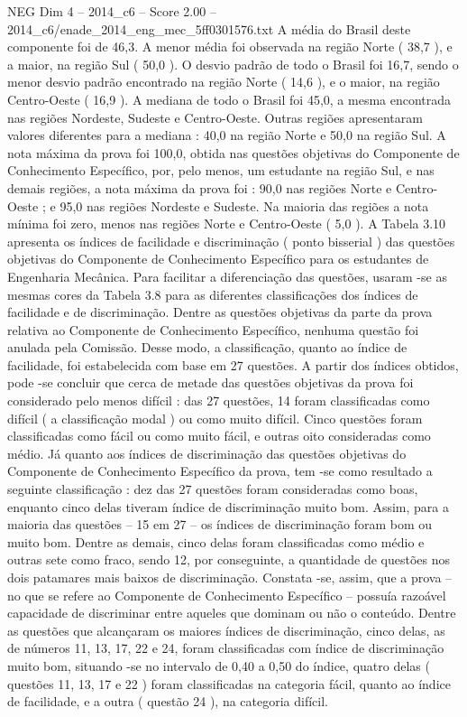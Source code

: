 \begin{textsample}{NEG Dim 4 – 2014\_c6 – Score 2.00 – 2014\_c6/enade\_2014\_eng\_mec\_5ff0301576.txt}
A média do Brasil deste componente foi de 46,3.
A menor média foi observada na região Norte ( 38,7 ), e a maior, na região Sul ( 50,0 ).
O desvio padrão de todo o Brasil foi 16,7, sendo o menor desvio padrão encontrado na região Norte ( 14,6 ), e o maior, na região Centro-Oeste ( 16,9 ).
A mediana de todo o Brasil foi 45,0, a mesma encontrada nas regiões Nordeste, Sudeste e Centro-Oeste.
Outras regiões apresentaram valores diferentes para a mediana : 40,0 na região Norte e 50,0 na região Sul.
A nota máxima da prova foi 100,0, obtida nas questões objetivas do Componente de Conhecimento Específico, por, pelo menos, um estudante na região Sul, e nas demais regiões, a nota máxima da prova foi : 90,0 nas regiões Norte e Centro-Oeste ; e 95,0 nas regiões Nordeste e Sudeste.
Na maioria das regiões a nota mínima foi zero, menos nas regiões Norte e Centro-Oeste ( 5,0 ).
A Tabela 3.10 apresenta os índices de facilidade e discriminação ( ponto bisserial ) das questões objetivas do Componente de Conhecimento Específico para os estudantes de Engenharia Mecânica.
Para facilitar a diferenciação das questões, usaram -se as mesmas cores da Tabela 3.8 para as diferentes classificações dos índices de facilidade e de discriminação.
Dentre as questões objetivas da parte da prova relativa ao Componente de Conhecimento Específico, nenhuma questão foi anulada pela Comissão.
Desse modo, a classificação, quanto ao índice de facilidade, foi estabelecida com base em 27 questões.
A partir dos índices obtidos, pode -se concluir que cerca de metade das questões objetivas da prova foi considerado pelo menos difícil : das 27 questões, 14 foram classificadas como difícil ( a classificação modal ) ou como muito difícil.
Cinco questões foram classificadas como fácil ou como muito fácil, e outras oito consideradas como médio.
Já quanto aos índices de discriminação das questões objetivas do Componente de Conhecimento Específico da prova, tem -se como resultado a seguinte classificação : dez das 27 questões foram consideradas como boas, enquanto cinco delas tiveram índice de discriminação muito bom.
Assim, para a maioria das questões – 15 em 27 – os índices de discriminação foram bom ou muito bom.
Dentre as demais, cinco delas foram classificadas como médio e outras sete como fraco, sendo 12, por conseguinte, a quantidade de questões nos dois patamares mais baixos de discriminação.
Constata -se, assim, que a prova – no que se refere ao Componente de Conhecimento Específico – possuía razoável capacidade de discriminar entre aqueles que dominam ou não o conteúdo.
Dentre as questões que alcançaram os maiores índices de discriminação, cinco delas, as de números 11, 13, 17, 22 e 24, foram classificadas com índice de discriminação muito bom, situando -se no intervalo de 0,40 a 0,50 do índice, quatro delas ( questões 11, 13, 17 e 22 ) foram classificadas na categoria fácil, quanto ao índice de facilidade, e a outra ( questão 24 ), na categoria difícil.

\end{textsample}

